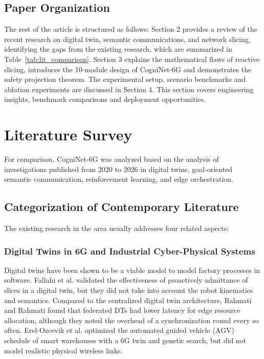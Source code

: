 \documentclass[twocolumn,10pt,twoside]{article}
\begin{document}
\subsection{Paper Organization}
The rest of the article is structured as follows: Section 2 provides a review of the recent research on digital twin, semantic communications, and network slicing, identifying the gaps from the existing research, which are summarized in Table~\ref{tab:lit_comparison}. Section 3 explains the mathematical flaws of reactive slicing, introduces the 10-module design of CogniNet-6G and demonstrates the safety projection theorem. The experimental setup, scenario benchmarks and ablation experiments are discussed in Section 4. This section covers engineering insights, benchmark comparisons and deployment opportunities.

\section{Literature Survey}
For comparison, CogniNet-6G was analyzed based on the analysis of investigations published from 2020 to 2026 in digital twins, goal-oriented semantic communication, reinforcement learning, and edge orchestration.

\subsection{Categorization of Contemporary Literature}
The existing research in the area usually addresses four related aspects:

\subsubsection{Digital Twins in 6G and Industrial Cyber-Physical Systems}
Digital twins have been shown to be a viable model to model factory processes in software. Fallahi et al. \cite{fallahi2026dt} validated the effectiveness of proactively admittance of slices in a digital twin, but they did not take into account the robot kinematics and semantics. Compared to the centralized digital twin architecture, Rahmati and Rahmati \cite{rahmati2026federated} found that federated DTs had lower latency for edge resource allocation, although they noted the overhead of a synchronization round every so often. Erel-Ozcevik et al. \cite{erel2026smart} optimized the automated guided vehicle (AGV) schedule of smart warehouses with a 6G twin and genetic search, but did not model realistic physical wireless links.
\end{document}
